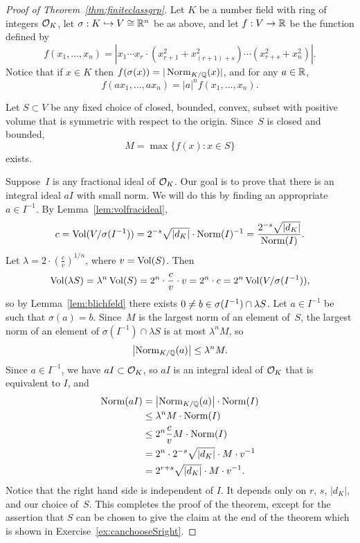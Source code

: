 \begin{proof}[Proof of Theorem~\ref{thm:finiteclassgrp}]
	Let $K$ be a number field with ring of integers $\mathcal{O}_K$,
	let $\sigma:K\hookrightarrow V\cong \mathbb{R}^n$ be as above,
	and let $f:V\to \mathbb{R}$ be the function defined by
	$$
		f(x_1,\ldots, x_n)
		= \left|
		x_1 \cdots x_r\cdot (x_{r+1}^2 + x_{(r+1)+s}^2)\cdots (x_{r+s}^2 + x_n^2)
		\right|.
	$$
	Notice that if $x\in K$ then $f(\sigma(x)) = |\operatorname{Norm}_{K/\mathbb{Q}}(x)|$,
	and for any $a\in \mathbb{R}$,
	$$
		f(ax_1, \ldots,  ax_n) = |a|^n f(x_1,\ldots, x_n).
	$$

	Let $S\subset V$ be any fixed choice of closed, bounded, convex, subset with
	positive volume that is symmetric with respect to the origin.
	Since~$S$ is closed and bounded,
	$$
		M = \max\{f(x) : x \in S\}
	$$
	exists.

	Suppose~$I$ is any  fractional ideal of $\mathcal{O}_K$.  Our goal
	is to prove that there is an integral ideal $aI$ with small norm. We
	will do this by finding an appropriate $a\in I^{-1}$.
	By Lemma~\ref{lem:volfracideal},
	$$
		c = \operatorname{Vol}(V/\sigma(I^{-1}))
		= 2^{-s}\sqrt{|d_K|}\cdot \operatorname{Norm}(I)^{-1}
		= \frac{2^{-s} \sqrt{|d_K|}}{\operatorname{Norm}(I)}.
	$$
	Let $\lambda = 2\cdot\left(\frac{c}{v}\right)^{1/n}$, where $v=\operatorname{Vol}(S)$.
	Then
	$$
		\operatorname{Vol}(\lambda{} S) = \lambda^n \operatorname{Vol}(S)
		= 2^n\cdot \frac{c}{v} \cdot v
		= 2^n\cdot c
		= 2^n \operatorname{Vol}(V/\sigma(I^{-1})),
	$$
	so by Lemma~\ref{lem:blichfeld} there exists
	$0\neq b\in \sigma(I^{-1})\cap \lambda S$.
	Let $a \in I^{-1}$ be such that $\sigma(a)=b$.
	Since~$M$ is the largest norm of an element of~$S$, the largest norm
	of an element of $\sigma(I^{-1})\cap  \lambda{}S$ is at most $\lambda^n M$,
	so
	$$
		\left|\operatorname{Norm}_{K/\mathbb{Q}}(a)\right| \leq \lambda^n M.
	$$
	Since $a\in I^{-1}$, we have $aI \subset \mathcal{O}_K$, so
	$aI$ is an integral ideal of $\mathcal{O}_K$ that is equivalent to $I$, and
	\begin{align*}
		\operatorname{Norm}(aI) &= \left|\operatorname{Norm}_{K/\mathbb{Q}}(a)\right|\cdot \operatorname{Norm}(I) \\
		&\leq \lambda^n M\cdot \operatorname{Norm}(I) \\
		&\leq 2^n \frac{c}{v} M \cdot \operatorname{Norm}(I) \\
		&= 2^n\cdot 2^{-s} \sqrt{|d_K|} \cdot M \cdot v^{-1} \\
		&= 2^{r+s} \sqrt{|d_K|} \cdot M \cdot v^{-1}.
	\end{align*}
	Notice that the right hand side is independent of $I$.  It
	depends only on $r$, $s$, $|d_K|$, and our choice of~$S$.
	This completes the proof of the theorem, except for
	the assertion that $S$ can be chosen to give the claim
	at the end of the theorem which is shown in Exercise~\ref{ex:canchooseSright}.
\end{proof}

